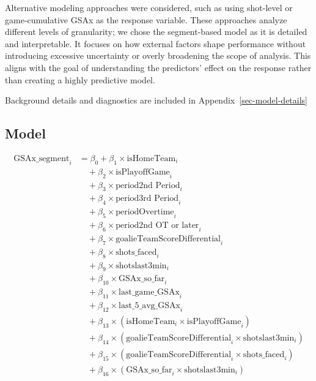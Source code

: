 \documentclass[
  letterpaper,
  DIV=11,
  numbers=noendperiod]{scrartcl}
\begin{document}
Alternative modeling approaches were considered, such as using
shot-level or game-cumulative GSAx as the response variable. These
approaches analyze different levels of granularity; we chose the
segment-based model as it is detailed and interpretable. It focuses on
how external factors shape performance without introducing excessive
uncertainty or overly broadening the scope of analysis. This aligns with
the goal of understanding the predictors' effect on the response rather
than creating a highly predictive model.

Background details and diagnostics are included in
Appendix~\ref{sec-model-details}

\subsection{Model}\label{model}

\begin{align}
\text{GSAx\_segment}_i &= \beta_0 
+ \beta_1 \times \text{isHomeTeam}_i \\
& \quad + \beta_2 \times \text{isPlayoffGame}_i \\
& \quad + \beta_3 \times \text{period2nd Period}_i \\
& \quad + \beta_4 \times \text{period3rd Period}_i \\
& \quad + \beta_5 \times \text{periodOvertime}_i \\
& \quad + \beta_6 \times \text{period2nd OT or later}_i \\
& \quad + \beta_7 \times \text{goalieTeamScoreDifferential}_i \\
& \quad + \beta_8 \times \text{shots\_faced}_i \\
& \quad + \beta_9 \times \text{shotslast3min}_i \\
& \quad + \beta_{10} \times \text{GSAx\_so\_far}_i \\
& \quad + \beta_{11} \times \text{last\_game\_GSAx}_i \\
& \quad + \beta_{12} \times \text{last\_5\_avg\_GSAx}_i \\
& \quad + \beta_{13} \times (\text{isHomeTeam}_i \times \text{isPlayoffGame}_i) \\
& \quad + \beta_{14} \times (\text{goalieTeamScoreDifferential}_i \times \text{shotslast3min}_i) \\
& \quad + \beta_{15} \times (\text{goalieTeamScoreDifferential}_i \times \text{shots\_faced}_i) \\
& \quad + \beta_{16} \times (\text{GSAx\_so\_far}_i \times \text{shotslast3min}_i)
\end{align}
\end{document}

